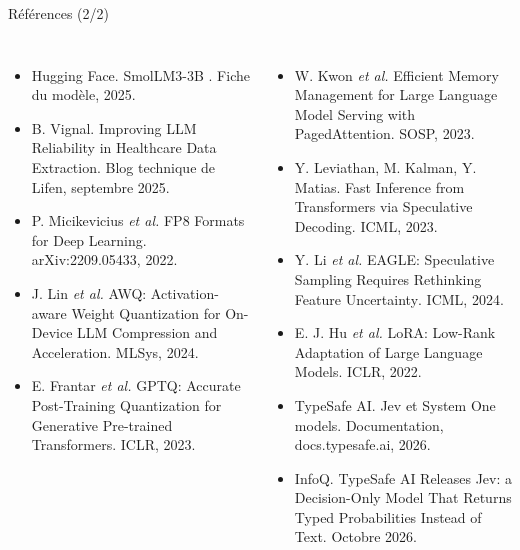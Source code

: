 \documentclass[11pt,aspectratio=169]{beamer}
\newcommand{\en}[1]{\foreignlanguage{english}{#1}}
\begin{document}
\begin{frame}[t]{Références (2/2)}
  \scriptsize
  \begin{columns}[T]
    \begin{itemize}
      \item[{[11]}] Hugging Face. \og SmolLM3-3B \fg. Fiche du modèle, 2025.
      \item[{[12]}] B. Vignal. \og \en{Improving LLM Reliability in Healthcare Data
        Extraction}\fg. Blog technique de Lifen, septembre 2025.
      \item[{[13]}] P. Micikevicius \textit{et al.} \og \en{FP8 Formats for Deep
        Learning}\fg. \en{arXiv:2209.05433}, 2022.
      \item[{[14]}] J. Lin \textit{et al.} \og \en{AWQ: Activation-aware Weight Quantization
        for On-Device LLM Compression and Acceleration}\fg. MLSys, 2024.
      \item[{[15]}] E. Frantar \textit{et al.} \og \en{GPTQ: Accurate Post-Training
        Quantization for Generative Pre-trained Transformers}\fg. ICLR, 2023.
    \end{itemize}
    \begin{itemize}
      \item[{[16]}] W. Kwon \textit{et al.} \og \en{Efficient Memory Management for Large
        Language Model Serving with PagedAttention}\fg. SOSP, 2023.
      \item[{[17]}] Y. Leviathan, M. Kalman, Y. Matias. \og \en{Fast Inference from
        Transformers via Speculative Decoding}\fg. ICML, 2023.
      \item[{[18]}] Y. Li \textit{et al.} \og \en{EAGLE: Speculative Sampling Requires
        Rethinking Feature Uncertainty}\fg. ICML, 2024.
      \item[{[19]}] E. J. Hu \textit{et al.} \og \en{LoRA: Low-Rank Adaptation of Large
        Language Models}\fg. ICLR, 2022.
      \item[{[20]}] TypeSafe AI. \og Jev \fg{} et \og \en{System One models}\fg.
        Documentation, docs.typesafe.ai, 2026.
      \item[{[21]}] InfoQ. \og \en{TypeSafe AI Releases Jev: a Decision-Only Model That
        Returns Typed Probabilities Instead of Text}\fg. Octobre 2026.
    \end{itemize}
  \end{columns}
\end{frame}
\end{document}
